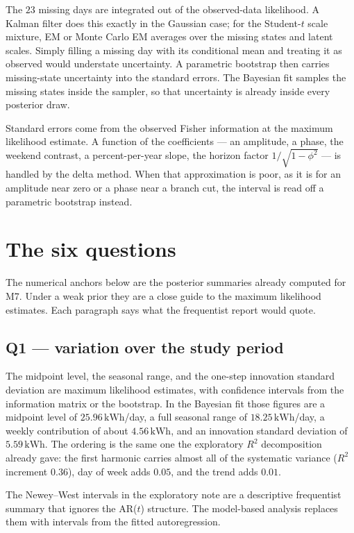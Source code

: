 \documentclass[11pt]{article}
\newcommand{\kwh}{\,\mathrm{kWh}}
\begin{document}
The $23$ missing days are integrated out of the observed-data likelihood. A
Kalman filter does this exactly in the Gaussian case; for the Student-$t$
scale mixture, EM or Monte Carlo EM averages over the missing states and
latent scales. Simply filling a missing day with its conditional mean and
treating it as observed would understate uncertainty. A parametric bootstrap
then carries missing-state uncertainty into the standard errors. The Bayesian
fit samples the missing states inside the sampler, so that uncertainty is
already inside every posterior draw.

Standard errors come from the observed Fisher information at the maximum
likelihood estimate. A function of the coefficients --- an amplitude, a phase,
the weekend contrast, a percent-per-year slope, the horizon factor
$1/\sqrt{1-\phi^2}$ --- is handled by the delta method. When that approximation
is poor, as it is for an amplitude near zero or a phase near a branch cut, the
interval is read off a parametric bootstrap instead.

\section{The six questions}

The numerical anchors below are the posterior summaries already computed for
M7. Under a weak prior they are a close guide to the maximum likelihood
estimates. Each paragraph says what the frequentist report would quote.

\subsection{Q1 --- variation over the study period}

The midpoint level, the seasonal range, and the one-step innovation standard
deviation are maximum likelihood estimates, with confidence intervals from the
information matrix or the bootstrap. In the Bayesian fit those figures are a
midpoint level of $25.96\kwh$/day, a full seasonal range of $18.25\kwh$/day,
a weekly contribution of about $4.56\kwh$, and an innovation standard
deviation of $5.59\kwh$. The ordering is the same one the exploratory $R^2$
decomposition already gave: the first harmonic carries almost all of the
systematic variance ($R^2$ increment $0.36$), day of week adds $0.05$, and
the trend adds $0.01$.

The Newey--West intervals in the exploratory note are a descriptive frequentist
summary that ignores the AR($t$) structure. The model-based analysis replaces
them with intervals from the fitted autoregression.
\end{document}

